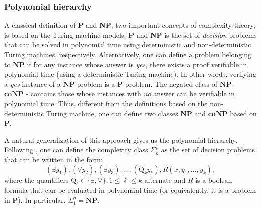 \documentclass{article}
\newcommand*{\cQ}{\mathrm{Q}}
\theoremstyle{plain}
\theoremstyle{definition}
\begin{document}
\subsubsection*{Polynomial hierarchy} 
A classical definition of $\mathbf{P}$ and $\mathbf{NP}$, two important concepts of complexity theory, is based on the Turing machine models: $\mathbf{P}$ and $\mathbf{NP}$ is the set of \emph{decision} problems that can be solved in polynomial time using deterministic and non-deterministic Turing machines, respectively. Alternatively, one can define a problem belonging to $\mathbf{NP}$ if for any instance whose answer is \emph{yes}, there exists a proof verifiable in polynomial time (using a deterministic Turing machine). In other words, verifying a \emph{yes} instance of a $\mathbf{NP}$ problem is a $\mathbf{P}$ problem. The negated class of $\mathbf{NP}$ - $\mathbf{coNP}$ - contains those whose instances with \emph{no} answer can be verifiable in polynomial time. Thus, different from the definitions based on the non-deterministic Turing machine, one can define two classes $\mathbf{NP}$ and $\mathbf{coNP}$ based on $\mathbf{P}$.

A natural generalization of this approach gives us the polynomial hierarchy. Following \cite[Theorem 3.1]{STOCKMEYER19761}, one can define the complexity class $\Sigma_k^p$ as the set of decision problems that can be written in the form:
\begin{equation*}
    (\exists y_1), (\forall y_2), (\exists y_3), \ldots, (\cQ_k y_k), R(x, y_1, \ldots, y_k),
\end{equation*}
where the quantifiers $\cQ_\ell \in \{\exists, \forall\}, 1 \leq \ell \leq k$ alternate and $R$ is a boolean formula that can be evaluated in polynomial time (or equivalently, it is a problem in $\mathbf{P}$). In particular, $\Sigma_1^p = \mathbf{NP}$.
\end{document}
